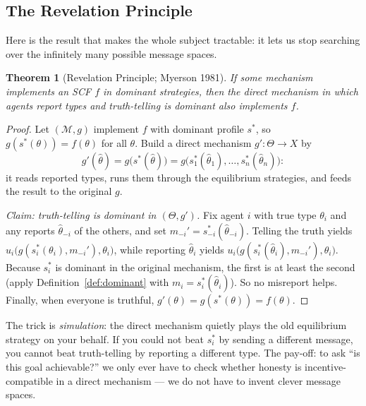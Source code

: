 \documentclass[11pt,letterpaper]{article}
\theoremstyle{definition}
\theoremstyle{plain}
\newtheorem{theorem}{Theorem}[section]
\theoremstyle{remark}
\newcommand{\type}{\theta}
\newcommand{\typespace}{\Theta}
\newcommand{\outcomes}{X}
\newcommand{\scf}{f}
\begin{document}
\subsection{The Revelation Principle}

Here is the result that makes the whole subject tractable: it lets us stop searching over the
infinitely many possible message spaces.

\begin{theorem}[Revelation Principle; Myerson 1981]
\label{thm:revelation}
If some mechanism implements an SCF $\scf$ in dominant strategies, then the \emph{direct}
mechanism in which agents report types and truth-telling is dominant also implements $\scf$.
\end{theorem}

\begin{proof}
Let $(\mathcal{M},g)$ implement $\scf$ with dominant profile $s^*$, so $g(s^*(\type))=\scf(\type)$
for all $\type$. Build a direct mechanism $g':\typespace\to\outcomes$ by
\[
  g'(\hat\type)=g\bigl(s^*(\hat\type)\bigr)=g\bigl(s_1^*(\hat\type_1),\dots,s_n^*(\hat\type_n)\bigr):
\]
it reads reported types, runs them through the equilibrium strategies, and feeds the result to
the original $g$.

\smallskip\noindent\emph{Claim: truth-telling is dominant in $(\typespace,g')$.}
Fix agent $i$ with true type $\type_i$ and any reports $\hat\type_{-i}$ of the others, and set
$m_{-i}'=s_{-i}^*(\hat\type_{-i})$. Telling the truth yields
$u_i\bigl(g(s_i^*(\type_i),m_{-i}'),\type_i\bigr)$, while reporting $\hat\type_i$ yields
$u_i\bigl(g(s_i^*(\hat\type_i),m_{-i}'),\type_i\bigr)$. Because $s_i^*$ is dominant in the
original mechanism, the first is at least the second (apply Definition~\ref{def:dominant} with
$m_i=s_i^*(\hat\type_i)$). So no misreport helps. Finally, when everyone is truthful,
$g'(\type)=g(s^*(\type))=\scf(\type)$.
\end{proof}

\begin{keyidea}
The trick is \emph{simulation}: the direct mechanism quietly plays the old equilibrium strategy
on your behalf. If you could not beat $s_i^*$ by sending a different message, you cannot beat
truth-telling by reporting a different type. The pay-off: to ask ``is this goal achievable?'' we
only ever have to check whether honesty is incentive-compatible in a direct mechanism --- we do
not have to invent clever message spaces.
\end{keyidea}
\end{document}
